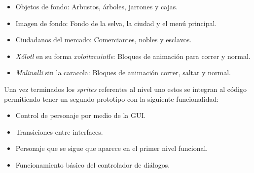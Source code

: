 \begin{itemize}
        \item Objetos de fondo: Arbustos, árboles, jarrones y cajas.
        \item Imagen de fondo: Fondo de la selva, la ciudad y el menú principal.
        \item Ciudadanos del mercado: Comerciantes, nobles y esclavos.
        \item \textit{Xólotl} en su forma \textit{xoloitzcuintle}: Bloques de
        animación para correr y normal.
        \item \textit{Malinalli} sin la caracola: Bloques de animación correr,
        saltar y normal.
\end{itemize}
Una vez terminados los \textit{sprites} referentes al nivel uno estos se integran
al código permitiendo tener un segundo prototipo con la siguiente funcionalidad:
\begin{itemize}
        \item Control de personaje por medio de la GUI.
        \item Transiciones entre interfaces.
        \item Personaje que se sigue que aparece en el primer nivel funcional.
        \item Funcionamiento básico del controlador de diálogos.
\end{itemize}
